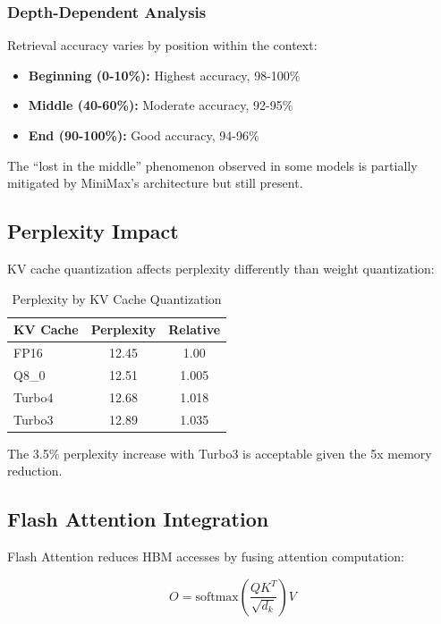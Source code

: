 \subsubsection{Depth-Dependent Analysis}

Retrieval accuracy varies by position within the context:

\begin{itemize}
    \item \textbf{Beginning (0-10\%):} Highest accuracy, 98-100\%
    \item \textbf{Middle (40-60\%):} Moderate accuracy, 92-95\%
    \item \textbf{End (90-100\%):} Good accuracy, 94-96\%
\end{itemize}

The ``lost in the middle'' phenomenon observed in some models is partially mitigated by MiniMax's architecture but still present.

\subsection{Perplexity Impact}

KV cache quantization affects perplexity differently than weight quantization:

\begin{table}[h]
\centering
\caption{Perplexity by KV Cache Quantization}
\label{tab:kv_perplexity}
\begin{tabular}{lcc}
\toprule
\textbf{KV Cache} & \textbf{Perplexity} & \textbf{Relative} \\
\midrule
FP16 & 12.45 & 1.00 \\
Q8\_0 & 12.51 & 1.005 \\
Turbo4 & 12.68 & 1.018 \\
Turbo3 & 12.89 & 1.035 \\
\bottomrule
\end{tabular}
\end{table}

The 3.5\% perplexity increase with Turbo3 is acceptable given the 5x memory reduction.

\subsection{Flash Attention Integration}

Flash Attention \cite{dao2022flashattention} reduces HBM accesses by fusing attention computation:

\begin{equation}
O = \text{softmax}\left(\frac{QK^T}{\sqrt{d_k}}\right)V
\end{equation}

